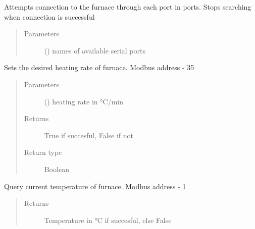 \documentclass[letterpaper,10pt,english]{sphinxmanual}
\begin{document}
\begin{fulllineitems}
\begin{fulllineitems}
\label{\detokenize{drivers:drivers.Furnace._connect}}
Attempts connection to the furnace through each port in ports. Stops searching when connection is successful
\begin{quote}\begin{description}
\item[{Parameters}] \leavevmode
{} () \textendash{} names of available serial ports

\end{description}\end{quote}

\end{fulllineitems}


\begin{fulllineitems}
\label{\detokenize{drivers:drivers.Furnace.heating_rate}}
Sets the desired heating rate of furnace.
Modbus address - 35
\begin{quote}\begin{description}
\item[{Parameters}] \leavevmode
{} (\sphinxstyleliteralemphasis{\sphinxupquote{, }}) \textendash{} heating rate in °C/min

\item[{Returns}] \leavevmode
True if succesful, False if not

\item[{Return type}] \leavevmode
Boolean

\end{description}\end{quote}

\end{fulllineitems}


\begin{fulllineitems}
\label{\detokenize{drivers:drivers.Furnace.indicated}}
Query current temperature of furnace.
Modbus address - 1
\begin{quote}\begin{description}
\item[{Returns}] \leavevmode
Temperature in °C if succesful, else False


\end{description}
\end{quote}
\end{fulllineitems}
\end{fulllineitems}
\end{document}
